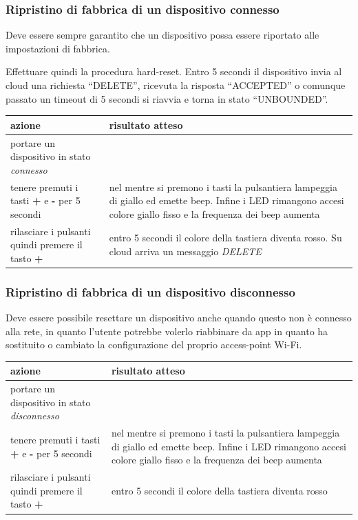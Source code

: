 \documentclass[a4paper,titlepage]{article}
\begin{document}
\subsubsection{Ripristino di fabbrica di un dispositivo connesso}
Deve essere sempre garantito che un dispositivo possa essere riportato alle impostazioni di fabbrica.

Effettuare quindi la procedura hard-reset. Entro 5 secondi il dispositivo invia al cloud una richiesta “DELETE”, ricevuta la risposta “ACCEPTED” o comunque passato un timeout di 5 secondi si riavvia e torna in stato “UNBOUNDED”.
\begin{center}
\begin{tabular}{| p{5cm} | p{5cm} |}
    \hline \textbf{azione} & \textbf{risultato atteso} \\
    \hline portare un dispositivo in stato \textit{connesso} & \\
    \hline tenere premuti i tasti \textbf{+} e \textbf{-} per 5 secondi & nel mentre si premono i tasti la pulsantiera lampeggia di giallo ed emette beep. Infine i LED rimangono accesi colore giallo fisso e la frequenza dei beep aumenta \\
    \hline rilasciare i pulsanti quindi premere il tasto \textbf{+} & entro 5 secondi il colore della tastiera diventa rosso. Su cloud arriva un messaggio \textit{DELETE} \\
    \hline
\end{tabular}
\end{center}

\subsubsection{Ripristino di fabbrica di un dispositivo disconnesso}

Deve essere possibile resettare un dispositivo anche quando questo non è connesso
alla rete, in quanto l'utente potrebbe volerlo riabbinare da app in quanto ha sostituito
o cambiato la configurazione del proprio access-point Wi-Fi.

\begin{center}
\begin{tabular}{| p{5cm} | p{5cm} |}
    \hline \textbf{azione} & \textbf{risultato atteso} \\
    \hline portare un dispositivo in stato \textit{disconnesso} & \\
    \hline tenere premuti i tasti \textbf{+} e \textbf{-} per 5 secondi & nel mentre si premono i tasti la pulsantiera lampeggia di giallo ed emette beep. Infine i LED rimangono accesi colore giallo fisso e la frequenza dei beep aumenta \\
    \hline rilasciare i pulsanti quindi premere il tasto \textbf{+} & entro 5 secondi il colore della tastiera diventa rosso \\
    \hline
\end{tabular}
\end{center}
\end{document}
